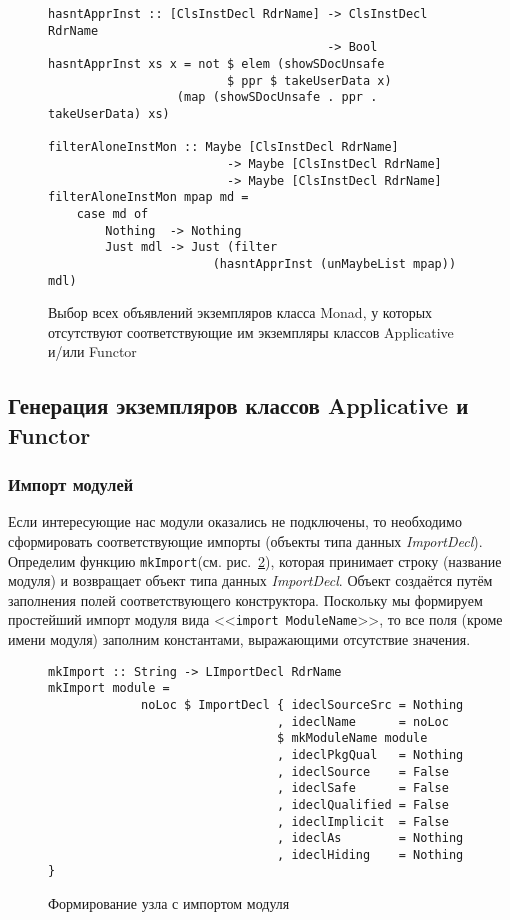 \begin{figure}[h]
\hrulefill
\begin{lstlisting}
hasntApprInst :: [ClsInstDecl RdrName] -> ClsInstDecl RdrName
                                       -> Bool
hasntApprInst xs x = not $ elem (showSDocUnsafe 
                         $ ppr $ takeUserData x) 
                  (map (showSDocUnsafe . ppr . takeUserData) xs)

filterAloneInstMon :: Maybe [ClsInstDecl RdrName]
                         -> Maybe [ClsInstDecl RdrName]
                         -> Maybe [ClsInstDecl RdrName]
filterAloneInstMon mpap md = 
    case md of
        Nothing  -> Nothing
        Just mdl -> Just (filter 
                       (hasntApprInst (unMaybeList mpap)) mdl)
\end{lstlisting}
\hrulefill
\caption{Выбор всех объявлений экземпляров класса Monad, у которых отсутствуют соответствующие им экземпляры классов Applicative и/или Functor}\label{p6}
\end{figure}
\subsection{Генерация экземпляров классов Applicative и
Functor}
\subsubsection{Импорт модулей}
Если интересующие нас модули оказались не подключены, то необходимо сформировать соответствующие импорты (объекты типа данных \textit{ImportDecl}). Определим функцию \lstinline{mkImport}(см. рис.~\ref{imp}), которая принимает строку (название модуля) и возвращает объект типа данных \textit{ImportDecl}. Объект создаётся путём заполнения полей соответствующего конструктора. Поскольку мы формируем простейший импорт модуля вида <<\lstinline{import ModuleName}>>, то все поля (кроме имени модуля) заполним константами, выражающими отсутствие значения.

\begin{figure}[h]
\hrulefill
\begin{lstlisting}
mkImport :: String -> LImportDecl RdrName
mkImport module = 
             noLoc $ ImportDecl { ideclSourceSrc = Nothing
                                , ideclName      = noLoc 
                                $ mkModuleName module
                                , ideclPkgQual   = Nothing
                                , ideclSource    = False
                                , ideclSafe      = False
                                , ideclQualified = False
                                , ideclImplicit  = False
                                , ideclAs        = Nothing
                                , ideclHiding    = Nothing }
\end{lstlisting}
\hrulefill
\caption{Формирование узла с импортом модуля}\label{imp}
\end{figure}

